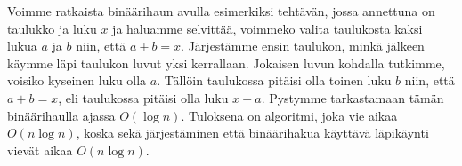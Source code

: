 Voimme ratkaista binäärihaun avulla esimerkiksi tehtävän,
jossa annettuna on taulukko ja luku $x$ ja haluamme selvittää,
voimmeko valita taulukosta kaksi lukua $a$ ja $b$ niin, että $a+b=x$.
Järjestämme ensin taulukon, minkä jälkeen käymme läpi taulukon
luvut yksi kerrallaan.
Jokaisen luvun kohdalla tutkimme, voisiko kyseinen luku olla $a$.
Tällöin taulukossa pitäisi olla toinen luku $b$ niin, että
$a+b=x$, eli taulukossa pitäisi olla luku $x-a$.
Pystymme tarkastamaan tämän binäärihaulla ajassa $O(\log n)$.
Tuloksena on algoritmi, joka vie aikaa $O(n \log n)$,
koska sekä järjestäminen että binäärihakua käyttävä läpikäynti
vievät aikaa $O(n \log n)$.